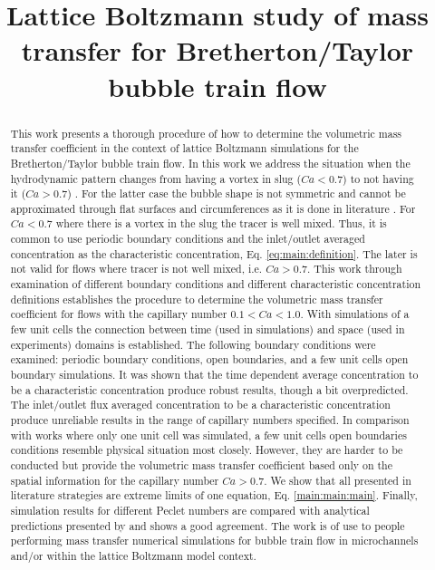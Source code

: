\documentclass{article}
\title{Lattice Boltzmann study of mass transfer for Bretherton/Taylor bubble train flow}
\begin{document}
\maketitle
\begin{abstract}
This work presents a thorough procedure of how to determine the volumetric mass transfer
coefficient
in the context of lattice Boltzmann simulations for the Bretherton/Taylor bubble train flow. In this work we address the situation when the hydrodynamic pattern changes from having a vortex in slug ($Ca<0.7$) to not having it ($Ca>0.7$) \cite{giavedoni-numerical}. For the latter case the bubble shape is not symmetric and cannot be approximated through flat surfaces and circumferences as it is done in literature \cite{vanbaten-circular,kreutzer-overview}. For $Ca<0.7$ where there is a vortex in the slug the tracer is well mixed. Thus, it is common to  use periodic boundary conditions  and the inlet/outlet averaged concentration as the characteristic concentration, Eq. \ref{eq:main:definition}.  The later is not valid for flows where tracer is not well mixed, i.e. $Ca>0.7$. This work through examination of different boundary conditions and different characteristic concentration definitions establishes the procedure to determine the volumetric mass transfer coefficient for flows with the capillary number $0.1<Ca<1.0$. With simulations of a few unit cells the connection between time (used in simulations) and space (used in experiments) domains is established. The following boundary conditions were examined: periodic boundary conditions, open boundaries, and a few unit cells open boundary
simulations. It was shown that the time dependent average concentration to be a characteristic
concentration produce robust results, though a bit overpredicted. The inlet/outlet flux averaged
concentration \cite{vanbaten-circular} to be a characteristic concentration produce unreliable results in the range of capillary numbers specified. In comparison with works \cite{vanbaten-circular,kreutzer-overview} where only one unit cell was simulated, a few
unit cells open boundaries conditions resemble physical situation most closely. However, they  are harder to be conducted 
but provide the volumetric mass transfer coefficient based only on the spatial information for the
capillary number $Ca>0.7$. 
We show
that all presented in literature strategies are extreme limits of one equation,
Eq. \ref{main:main:main}. Finally, simulation results for different Peclet numbers
are compared with analytical predictions presented by \citet{vanbaten-circular} and shows a good
agreement. The work is of use to people performing mass transfer numerical simulations for bubble
train flow in microchannels and/or within the
lattice Boltzmann model context.
\end{abstract}
\end{document}
